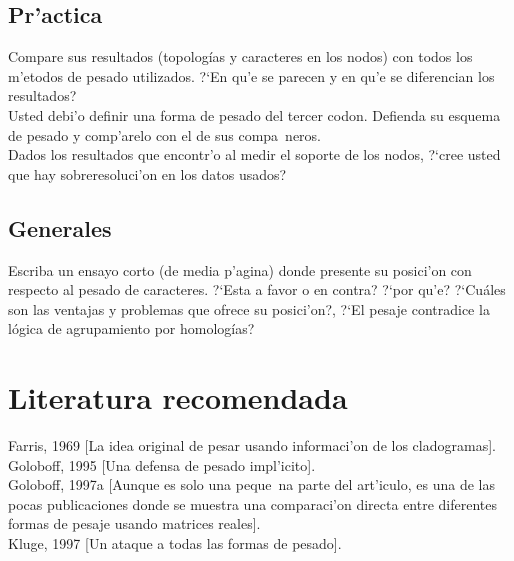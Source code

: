 \subsection{Pr'actica}
\noindent
Compare sus resultados (topolog\'ias y caracteres en los nodos) con todos los m'etodos de pesado utilizados. ?`En qu'e se parecen y en qu'e se diferencian los resultados?\\
Usted debi'o definir una forma de pesado del tercer codon. Defienda su esquema de pesado y comp'arelo con el de sus compa~neros.\\
Dados los resultados que encontr'o al medir el soporte de los nodos, ?`cree usted que hay sobreresoluci'on en los datos usados?\\
\subsection{Generales}
\noindent
Escriba un ensayo corto (de media p'agina) donde presente su posici'on con respecto al pesado de caracteres. ?`Esta a favor o en contra? ?`por qu'e? ?`Cu\'ales son las ventajas y problemas que ofrece su posici'on?, ?`El pesaje contradice la l\'ogica de agrupamiento por homolog\'ias?\\

\section{Literatura recomendada}
\noindent
Farris, 1969 [La idea original de pesar usando informaci'on de los cladogramas].\\
Goloboff, 1995 [Una defensa de pesado impl'icito].\\
Goloboff, 1997a [Aunque es solo una peque~na parte del art'iculo, es una de las pocas publicaciones donde se muestra una comparaci'on directa entre diferentes formas de pesaje usando matrices reales].\\
Kluge, 1997 [Un ataque a todas las formas de pesado].